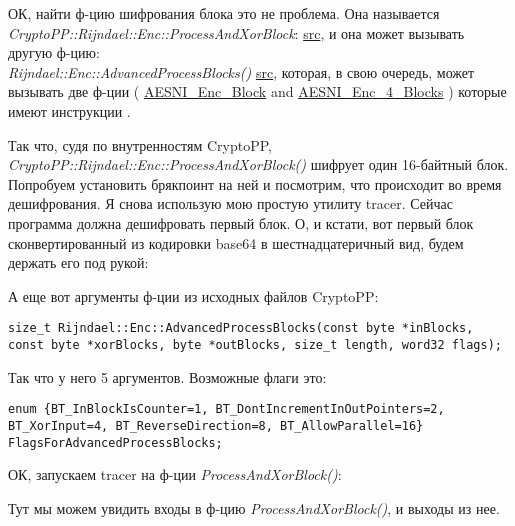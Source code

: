 ОК, найти ф-цию шифрования блока это не проблема.
Она называется \\
\emph{CryptoPP::Rijndael::Enc::ProcessAndXorBlock}:
\href{https://github.com/mmoss/cryptopp/blob/2772f7b57182b31a41659b48d5f35a7b6cedd34d/src/rijndael.cpp#L349}{src},
и она может вызывать другую ф-цию: \\
\emph{Rijndael::Enc::AdvancedProcessBlocks()}
\href{https://github.com/mmoss/cryptopp/blob/2772f7b57182b31a41659b48d5f35a7b6cedd34d/src/rijndael.cpp#L1179}{src},
которая, в свою очередь, может вызывать две ф-ции (
\href{https://github.com/mmoss/cryptopp/blob/2772f7b57182b31a41659b48d5f35a7b6cedd34d/src/rijndael.cpp#L1000}{AESNI\_Enc\_Block}
and
\href{https://github.com/mmoss/cryptopp/blob/2772f7b57182b31a41659b48d5f35a7b6cedd34d/src/rijndael.cpp#L1012}{AESNI\_Enc\_4\_Blocks}
)
которые имеют инструкции .

Так что, судя по внутренностям CryptoPP, \\
\emph{CryptoPP::Rijndael::Enc::ProcessAndXorBlock()} шифрует один 16-байтный блок.
Попробуем установить брякпоинт на ней и посмотрим, что происходит во время дешифрования.
Я снова использую мою простую утилиту tracer.
Сейчас программа должна дешифровать первый блок.
О, и кстати, вот первый блок сконвертированный из кодировки base64 в шестнадцатеричный вид, будем держать его под рукой:



А еще вот аргументы ф-ции из исходных файлов CryptoPP:

\begin{lstlisting}
size_t Rijndael::Enc::AdvancedProcessBlocks(const byte *inBlocks, const byte *xorBlocks, byte *outBlocks, size_t length, word32 flags);
\end{lstlisting}

Так что у него 5 аргументов. Возможные флаги это:

\begin{lstlisting}
enum {BT_InBlockIsCounter=1, BT_DontIncrementInOutPointers=2, BT_XorInput=4, BT_ReverseDirection=8, BT_AllowParallel=16} FlagsForAdvancedProcessBlocks;
\end{lstlisting}

ОК, запускаем tracer на ф-ции \emph{ProcessAndXorBlock()}:



Тут мы можем увидить входы в ф-цию \emph{ProcessAndXorBlock()}, и выходы из нее.

